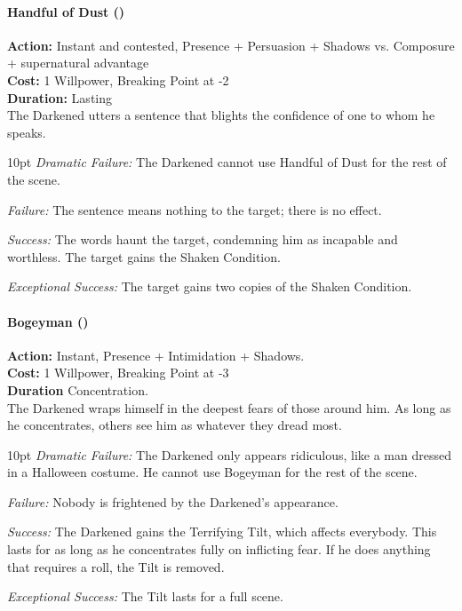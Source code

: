 \paragraph*{Handful of Dust (\textbullet\textbullet)}

\noindent \textbf{Action:} Instant and contested, Presence + Persuasion + Shadows vs. Composure + supernatural advantage \\

\noindent \textbf{Cost:} 1 Willpower, Breaking Point at -2\\

\noindent \textbf{Duration:} Lasting \\

\noindent The Darkened utters a sentence that blights the confidence of one to whom he speaks.

   \begin{myindentpar}{10pt}  \emph{Dramatic Failure:} The Darkened cannot use Handful of Dust for the rest of the scene.
   
    \emph{Failure:} The sentence means nothing to the target; there is no effect.
    
    \emph{Success:} The words haunt the target, condemning him as incapable and worthless. The target gains the Shaken Condition.
    
    \emph{Exceptional Success:} The target gains two copies of the Shaken Condition.\end{myindentpar}

\paragraph*{Bogeyman (\textbullet\textbullet\textbullet)} 

\noindent \textbf{Action:} Instant, Presence + Intimidation + Shadows. \\

\noindent \textbf{Cost:} 1 Willpower, Breaking Point at -3\\

\noindent \textbf{Duration} Concentration.\\

\noindent The Darkened wraps himself in the deepest fears of those around him. As long as he concentrates, others see him as whatever they dread most.

\begin{myindentpar}{10pt}    \emph{Dramatic Failure:} The Darkened only appears ridiculous, like a man dressed in a Halloween costume. He cannot use Bogeyman for the rest of the scene.

    \emph{Failure:} Nobody is frightened by the Darkened's appearance.
    
    \emph{Success:} The Darkened gains the Terrifying Tilt, which affects everybody. This lasts for as long as he concentrates fully on inflicting fear. If he does anything that requires a roll, the Tilt is removed. 
    
    \emph{Exceptional Success:} The Tilt lasts for a full scene.\end{myindentpar}    
    

